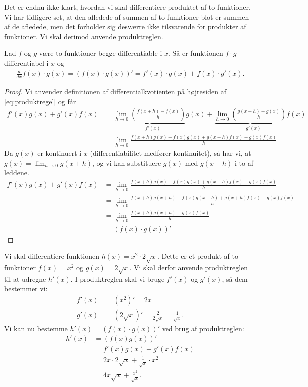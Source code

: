 Det er endnu ikke klart, hvordan vi skal differentiere produktet af to funktioner. Vi har tidligere set, at den afledede af summen af to funktioner blot er summen af de afledede, men det forholder sig desværre ikke tilsvarende for produkter af funktioner. Vi skal derimod anvende produktreglen.
\begin{setn}[Produktreglen]
Lad $f$ og $g$ være to funktioner begge differentiable i $x$. Så er funktionen $f\cdot g$ differentiabel i $x$ og 
\begin{align}\label{eq:produktregel}
\frac{d}{dx} f(x)\cdot g(x) = \left(f(x)\cdot g(x)\right)' = f'(x)\cdot g(x) + f(x)\cdot g'(x).
\end{align}
\end{setn}
\begin{proof}
Vi anvender definitionen af differentialkvotienten på højresiden af \eqref{eq:produktregel} og får
\begin{align*}
f'(x)g(x)+g'(x)f(x) &= \underbrace{\lim_{h\to 0}\left(\frac{f(x+h)-f(x)}{h}\right)}_{=f'(x)}g(x) + \underbrace{\lim_{h\to 0}\left(\frac{g(x+h)-g(x)}{h}\right)}_{=g'(x)}f(x)\\
&=\lim_{h\to 0} \frac{f(x+h)g(x)-f(x)g(x)+g(x+h)f(x)-g(x)f(x)}{h}
\end{align*}
Da $g(x)$ er kontinuert i $x$ (differentiabilitet medfører kontinuitet), så har vi, at $g(x) = \lim_{h\to 0}g(x+h)$, og vi kan substituere $g(x)$ med $g(x+h)$ i to af leddene.
\begin{align*}
f'(x)g(x)+g'(x)f(x) &=  \lim_{h\to 0} \frac{f(x+h)g(x)-f(x)g(x)+g(x+h)f(x)-g(x)f(x)}{h}\\
&=\lim_{h\to 0} \frac{f(x+h)g(x+h)-f(x)g(x+h)+g(x+h)f(x)-g(x)f(x)}{h}\\
&=\lim_{h\to 0} \frac{f(x+h)g(x+h) -g(x)f(x)}{h}\\
&= (f(x)\cdot g(x))'
\end{align*}
\end{proof}

\begin{exa}
Vi skal differentiere funktionen $h(x) = x^2\cdot 2\sqrt{x}$. Dette er et produkt af to funktioner
$f(x) = x^2$ og $g(x)= 2\sqrt{x}$. Vi skal derfor anvende produktreglen til at udregne $h'(x)$. I produktreglen skal vi bruge $f'(x)$ og $g'(x)$, så dem bestemmer vi:
\begin{align*}
f'(x) &= (x^2)' = 2x\\
g'(x) &= (2\sqrt{x})' = \frac{2}{2\sqrt{x}} = \frac{1}{\sqrt{x}}.
\end{align*} 
Vi kan nu bestemme $h'(x) = (f(x)\cdot g(x))'$ ved brug af produktreglen:
\begin{align*}
h'(x) &= (f(x)g(x))' \\
&= f'(x)g(x)+g'(x)f(x) \\
&= 2x\cdot 2\sqrt{x} + \frac{1}{\sqrt{x}}\cdot x^2\\
&= 4x\sqrt{x} + \frac{x^2}{\sqrt{x}}.
\end{align*}
\end{exa}

